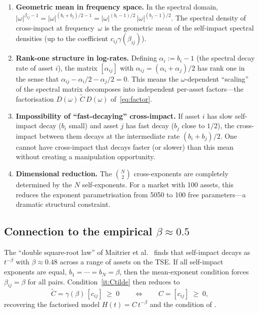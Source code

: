 \documentclass[12pt]{article}
\theoremstyle{definition}
\theoremstyle{remark}
\newcommand{\bC}{\widetilde{C}}
\begin{document}
\begin{enumerate}[label=(\roman*),nosep]
\item \textbf{Geometric mean in frequency space.}
In the spectral domain, $|\omega|^{\beta_{ij}-1} = |\omega|^{(b_i+b_j)/2-1}
= |\omega|^{(b_i-1)/2}\,|\omega|^{(b_j-1)/2}$.
The spectral density of cross-impact at frequency~$\omega$ is the geometric mean of the
self-impact spectral densities (up to the coefficient $c_{ij}\gamma(\beta_{ij})$).

\item \textbf{Rank-one structure in log-rates.}
Defining $\alpha_i := b_i - 1$ (the spectral decay rate of asset $i$), the matrix
$[\alpha_{ij}]$ with $\alpha_{ij} = (\alpha_i+\alpha_j)/2$ has rank one
in the sense that $\alpha_{ij}-\alpha_i/2-\alpha_j/2=0$.
This means the $\omega$-dependent ``scaling'' of the spectral matrix decomposes into
independent per-asset factors---the factorisation $D(\omega)\,\bC\,D(\omega)$
of~\eqref{eq:factor}.

\item \textbf{Impossibility of ``fast-decaying'' cross-impact.}
If asset $i$ has slow self-impact decay ($b_i$ small) and asset $j$ has fast decay
($b_j$ close to $1/2$), the cross-impact between them decays at the intermediate rate
$(b_i+b_j)/2$.  One cannot have cross-impact that decays faster (or slower) than this mean
without creating a manipulation opportunity.

\item \textbf{Dimensional reduction.}
The $\binom{N}{2}$ cross-exponents are completely determined by the $N$ self-exponents.
For a market with 100 assets, this reduces the exponent parametrisation from 5050 to 100
free parameters---a dramatic structural constraint.
\end{enumerate}

\subsection{Connection to the empirical \texorpdfstring{$\beta\approx 0.5$}{beta approx 0.5}}
\label{sec:empirical}

The ``double square-root law'' of Maitrier et al.~\cite{MLKB2026} finds that self-impact
decays as $t^{-\beta}$ with $\beta\approx 0.48$ across a range of assets on the TSE\@.
If all self-impact exponents are equal, $b_1=\cdots=b_N=\beta$, then the mean-exponent
condition forces $\beta_{ij}=\beta$ for all pairs.  Condition~\ref{it:Ctilde} then reduces to
\begin{equation}\label{eq:homo}
  \bC = \gamma(\beta)\,[c_{ij}] \;\ge\; 0
  \qquad\Longleftrightarrow\qquad
  C = [c_{ij}] \;\ge\; 0,
\end{equation}
recovering the factorised model $H(t) = C\,t^{-\beta}$ and the condition of
\cite[Cor.~2.18]{AbiJaberNeumanTuschmann2026}.
\end{document}
